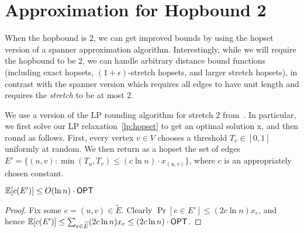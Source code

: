 

\section{Approximation for Hopbound 2} \label{app:2hop}
When the hopbound is $2$, we can get improved bounds by using the hopset version of a spanner approximation algorithm.  Interestingly, while we will require the hopbound to be $2$, we can handle arbitrary distance bound functions (including exact hopsets, $(1+\epsilon)$-stretch hopsets, and larger stretch hopsets), in contrast with the spanner version which requires all edges to have unit length and requires the \emph{stretch} to be at most $2$.

 
We use a version of the LP rounding algorithm for stretch $2$ from~\cite{DK11}.  In particular, we first solve our LP relaxation~\eqref{lp:hopset} to get an optimal solution $\bm{\mathrm{x}}$, and then round as follows.  First, every vertex $v \in V$ chooses a threshold $T_v \in [0,1]$ uniformly at random.  We then return as a hopset the set of edges $E' = \{(u,v) : \min(T_u, T_v) \leq (c \ln n) \cdot x_{(u,v)} \}$, where $c$ is an appropriately chosen constant. 

\begin{lemma} \label{lem:2hop-cost}
    $\operatorname*{\mathbb{E}}[c(E')] \leq O(\ln n) \cdot {\sf OPT}$
\end{lemma}
\begin{proof}
    Fix some $e = (u,v) \in \widetilde{E}$.
    Clearly $\Pr[e \in E'] \leq (2c\ln n) x_e$, and hence $\operatorname*{\mathbb{E}}[c(E')] \leq \sum_{e \in \widetilde{E}} (2c\ln n) x_e \leq (2c \ln n) \cdot {\sf OPT}$.
\end{proof}

